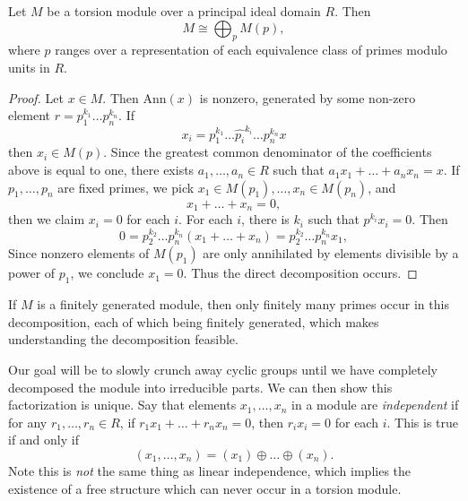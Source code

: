 \begin{lemma}
    Let $M$ be a torsion module over a principal ideal domain $R$. Then
    \[ M \cong \bigoplus_p M(p), \]
    where $p$ ranges over a representation of each equivalence class of primes modulo units in $R$.
\end{lemma}
\begin{proof}
    Let $x \in M$. Then $\text{Ann}(x)$ is nonzero, generated by some non-zero element $r = p_1^{k_1} \dots p_n^{k_n}$. If
    \[ x_i = p_1^{k_1} \dots \widehat{p_i}^{k_i} \dots p_n^{k_n} x \]
    then $x_i \in M(p)$. Since the greatest common denominator of the coefficients above is equal to one, there exists $a_1,\dots,a_n \in R$ such that $a_1x_1 + \dots + a_nx_n = x$. If $p_1,\dots,p_n$ are fixed primes, we pick $x_1 \in M(p_1), \dots, x_n \in M(p_n)$, and
    \[ x_1 + \dots + x_n = 0, \] 
    then we claim $x_i = 0$ for each $i$. For each $i$, there is $k_i$ such that $p^{k_i}x_i = 0$. Then
    \[ 0 = p_2^{k_2} \dots p_n^{k_n}(x_1 + \dots + x_n) = p_2^{k_2} \dots p_n^{k_n} x_1, \]
    Since nonzero elements of $M(p_1)$ are only annihilated by elements divisible by a power of $p_1$, we conclude $x_1 = 0$. Thus the direct decomposition occurs.
\end{proof}

\begin{remark}
    If $M$ is a finitely generated module, then only finitely many primes occur in this decomposition, each of which being finitely generated, which makes understanding the decomposition feasible.
\end{remark}

Our goal will be to slowly crunch away cyclic groups until we have completely decomposed the module into irreducible parts. We can then show this factorization is unique. Say that elements $x_1,\dots, x_n$ in a module are \emph{independent} if for any $r_1,\dots,r_n \in R$, if $r_1x_1 + \dots + r_nx_n = 0$, then $r_ix_i = 0$ for each $i$. This is true if and only if
%
\[ (x_1,\dots,x_n) = (x_1) \oplus \dots \oplus (x_n). \]
%
Note this is \emph{not} the same thing as linear independence, which implies the existence of a free structure which can never occur in a torsion module.


